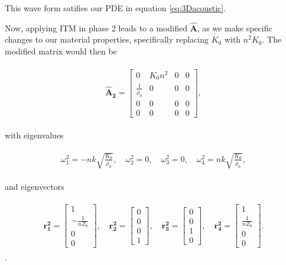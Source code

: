 This wave form satifies our PDE in equation \ref{eq:3Dacoustic}.

Now, applying ITM in phase 2 leads to a modified $\mathbf{\hat{A}}$, as we make specific changes to our material properties, specifically replacing $K_0$ with $n^2K_0$. The modified matrix would then be

\begin{align}
    \begin{split}
    \mathbf{\hat{A}_2} = \begin{bmatrix}
        0 & K_{0} n^{2} & 0 & 0 \\
\frac{1}{\rho_{0}} & 0 & 0 & 0 \\
0 & 0 & 0 & 0 \\
0 & 0 & 0 & 0
    \end{bmatrix},
    \end{split}
\end{align}

with eigenvalues

\begin{align}
    \begin{split}
    \omega_1^2 = -n k \sqrt{\frac{K_{0}}{\rho_{0}}}, \quad
    \omega_2^2 = 0, \quad
    \omega_3^2 = 0, \quad
    \omega_4^2 = n k \sqrt{\frac{K_{0}}{\rho_{0}}},
\end{split}
\end{align}

and eigenvectors

\begin{align}
    \begin{split}
    \mathbf{r_1^2} = \begin{bmatrix}
        1 \\
-\frac{1}{n Z_0} \\
0 \\
0
        \end{bmatrix}, \quad
        \mathbf{r_2^2} = \begin{bmatrix}
            0 \\
0 \\
0 \\
1
            \end{bmatrix}, \quad
            \mathbf{r_3^2} = \begin{bmatrix}
                0 \\
                0 \\
                1 \\
                0
                \end{bmatrix}, \quad
                \mathbf{r_4^2} = \begin{bmatrix}
                    1 \\
                    \frac{1}{n Z_0} \\
                    0 \\
                    0                    
                \end{bmatrix}.
    \end{split}
\end{align} .

